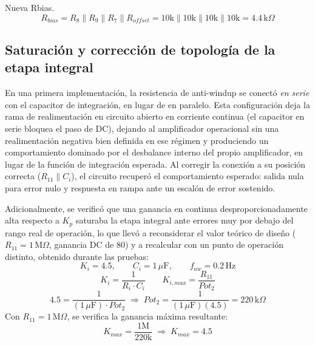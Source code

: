\documentclass[conference]{IEEEtran}
\begin{document}
Nueva Rbias.
\begin{equation}
R_{bias}=R_8\parallel R_9\parallel R_{7}\parallel R_{offset} = 10\text{k}\parallel10\text{k}\parallel10\text{k}\parallel10\text{k}=
\boxed{4.4\,\text{k}\Omega}
\end{equation}

\subsection{Saturación y corrección de topología de la etapa integral}
En una primera implementación, la resistencia de anti-windup se conectó \emph{en serie} con el capacitor de integración, en lugar de en paralelo. Esta configuración deja la rama de realimentación en circuito abierto en corriente continua (el capacitor en serie bloquea el paso de DC), dejando al amplificador operacional sin una realimentación negativa bien definida en ese régimen y produciendo un comportamiento dominado por el desbalance interno del propio amplificador, en lugar de la función de integración esperada. Al corregir la conexión a su posición correcta ($R_{11} \parallel C_i$), el circuito recuperó el comportamiento esperado: salida nula para error nulo y respuesta en rampa ante un escalón de error sostenido.

Adicionalmente, se verificó que una ganancia en continua desproporcionadamente alta respecto a $K_p$ saturaba la etapa integral ante errores muy por debajo del rango real de operación, lo que llevó a reconsiderar el valor teórico de diseño ($R_{11}=1\,\text{M}\Omega$, ganancia DC de 80) y a recalcular con un punto de operación distinto, obtenido durante las pruebas:
\begin{equation}
K_i=4.5,\qquad C_i=1\,\mu\text{F},\qquad f_{aw}=0.2\,\text{Hz}
\end{equation}
\begin{equation}
K_i=\frac{1}{R_i\cdot C_i} \qquad K_{i,max}=\frac{R_{11}}{Pot_2}
\end{equation}
\begin{equation}
4.5=\frac{1}{(1\,\mu\text{F})\cdot Pot_2} \;\Rightarrow\; Pot_2=\frac{1}{(1\,\mu\text{F})(4.5)}=\boxed{220\,\text{k}\Omega}
\end{equation}
Con $R_{11}=1\,\text{M}\Omega$, se verifica la ganancia máxima resultante:
\begin{equation}
K_{max}=\frac{1\text{M}}{220\text{k}} \;\Rightarrow\; \boxed{K_{max}=4.5}
\end{equation}
\end{document}
